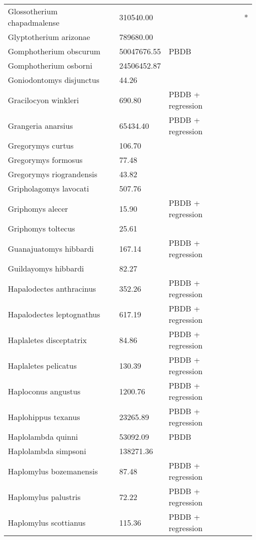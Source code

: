 \documentclass{article}
\begin{document}
\begin{center}
\begin{longtable}{p{} p{} p{} p{}}
    Glossotherium chapadmalense & 310540.00 & \cite{McDonald2005} & * \\ 
    Glyptotherium arizonae & 789680.00 & \cite{McDonald2005} &  \\ 
    Gomphotherium obscurum & 50047676.55 & PBDB &  \\ 
    Gomphotherium osborni & 24506452.87 & \cite{Wang2014} &  \\ 
    Goniodontomys disjunctus & 44.26 & \cite{Tomiya2013} &  \\ 
    Gracilocyon winkleri & 690.80 & PBDB + regression &  \\ 
    Grangeria anarsius & 65434.40 & PBDB + regression &  \\ 
    Gregorymys curtus & 106.70 & \cite{Tomiya2013} &  \\ 
    Gregorymys formosus & 77.48 & \cite{Tomiya2013} &  \\ 
    Gregorymys riograndensis & 43.82 & \cite{Tomiya2013} &  \\ 
    Gripholagomys lavocati & 507.76 & \cite{Tomiya2013} &  \\ 
    Griphomys alecer & 15.90 & PBDB + regression &  \\ 
    Griphomys toltecus & 25.61 & \cite{Mihlbachler2006} &  \\ 
    Guanajuatomys hibbardi & 167.14 & PBDB + regression &  \\ 
    Guildayomys hibbardi & 82.27 & \cite{Tomiya2013} &  \\ 
    Hapalodectes anthracinus & 352.26 & PBDB + regression &  \\ 
    Hapalodectes leptognathus & 617.19 & PBDB + regression &  \\ 
    Haplaletes disceptatrix & 84.86 & PBDB + regression &  \\ 
    Haplaletes pelicatus & 130.39 & PBDB + regression &  \\ 
    Haploconus angustus & 1200.76 & PBDB + regression &  \\ 
    Haplohippus texanus & 23265.89 & PBDB + regression &  \\ 
    Haplolambda quinni & 53092.09 & PBDB &  \\ 
    Haplolambda simpsoni & 138271.36 & \cite{Tedford1994} &  \\ 
    Haplomylus bozemanensis & 87.48 & PBDB + regression &  \\ 
    Haplomylus palustris & 72.22 & PBDB + regression &  \\ 
    Haplomylus scottianus & 115.36 & PBDB + regression &  \\ 

\end{longtable}
\end{center}
\end{document}
